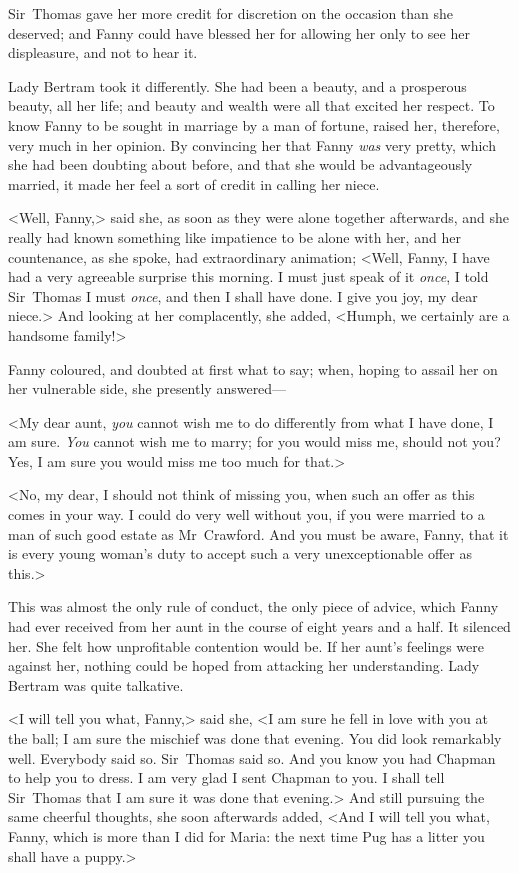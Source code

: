 Sir~Thomas gave her more credit for discretion on the occasion than she deserved; and Fanny could have blessed her for allowing her only to see her displeasure, and not to hear it.

Lady Bertram took it differently. She had been a beauty, and a prosperous beauty, all her life; and beauty and wealth were all that excited her respect. To know Fanny to be sought in marriage by a man of fortune, raised her, therefore, very much in her opinion. By convincing her that Fanny \textit{was}  very pretty, which she had been doubting about before, and that she would be advantageously married, it made her feel a sort of credit in calling her niece.

<Well, Fanny,> said she, as soon as they were alone together afterwards, and she really had known something like impatience to be alone with her, and her countenance, as she spoke, had extraordinary animation; <Well, Fanny, I have had a very agreeable surprise this morning. I must just speak of it \textit{once}, I told Sir~Thomas I must \textit{once}, and then I shall have done. I give you joy, my dear niece.> And looking at her complacently, she added, <Humph, we certainly are a handsome family!>

Fanny coloured, and doubted at first what to say; when, hoping to assail her on her vulnerable side, she presently answered—

<My dear aunt, \textit{you}  cannot wish me to do differently from what I have done, I am sure. \textit{You}  cannot wish me to marry; for you would miss me, should not you? Yes, I am sure you would miss me too much for that.>

<No, my dear, I should not think of missing you, when such an offer as this comes in your way. I could do very well without you, if you were married to a man of such good estate as Mr~Crawford. And you must be aware, Fanny, that it is every young woman's duty to accept such a very unexceptionable offer as this.>

This was almost the only rule of conduct, the only piece of advice, which Fanny had ever received from her aunt in the course of eight years and a half. It silenced her. She felt how unprofitable contention would be. If her aunt's feelings were against her, nothing could be hoped from attacking her understanding. Lady Bertram was quite talkative.

<I will tell you what, Fanny,> said she, <I am sure he fell in love with you at the ball; I am sure the mischief was done that evening. You did look remarkably well. Everybody said so. Sir~Thomas said so. And you know you had Chapman to help you to dress. I am very glad I sent Chapman to you. I shall tell Sir~Thomas that I am sure it was done that evening.> And still pursuing the same cheerful thoughts, she soon afterwards added, <And I will tell you what, Fanny, which is more than I did for Maria: the next time Pug has a litter you shall have a puppy.> 